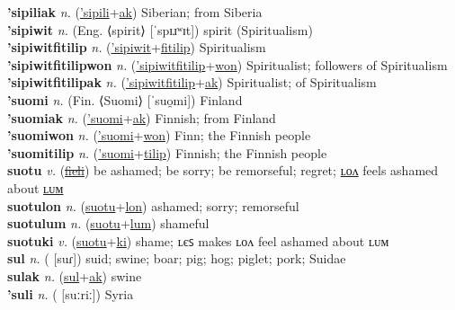 \textbf{'sipiliak} \textit{n.} (\hyperref['sipili]{'sipili}+\hyperref[ak]{ak})
Siberian; from Siberia \label{'sipiliak} \\
\textbf{'sipiwit} \textit{n.} (Eng. ⟨spirit⟩ [ˈspɪɹʷɪt])
spirit (Spiritualism) \label{'sipiwit} \\
\textbf{'sipiwitfitilip} \textit{n.} (\hyperref['sipiwit]{'sipiwit}+\hyperref[fitilip]{fitilip})
Spiritualism \label{'sipiwitfitilip} \\
\textbf{'sipiwitfitilipwon} \textit{n.} (\hyperref['sipiwitfitilip]{'sipiwitfitilip}+\hyperref[won]{won})
Spiritualist; followers of Spiritualism \label{'sipiwitfitilipwon} \\
\textbf{'sipiwitfitilipak} \textit{n.} (\hyperref['sipiwitfitilip]{'sipiwitfitilip}+\hyperref[ak]{ak})
Spiritualist; of Spiritualism \label{'sipiwitfitilipak} \\
\textbf{'suomi} \textit{n.} (Fin. ⟨Suomi⟩ [ˈsuo̯mi])
Finland \label{'suomi} \\
\textbf{'suomiak} \textit{n.} (\hyperref['suomi]{'suomi}+\hyperref[ak]{ak})
Finnish; from Finland \label{'suomiak} \\
\textbf{'suomiwon} \textit{n.} (\hyperref['suomi]{'suomi}+\hyperref[won]{won})
Finn; the Finnish people \label{'suomiwon} \\
\textbf{'suomitilip} \textit{n.} (\hyperref['suomi]{'suomi}+\hyperref[tilip]{tilip})
Finnish; the Finnish people \label{'suomitilip} \\
\textbf{suotu} \textit{v.} (\hyperref[fieli]{\sout{fieli}})
be ashamed; be sorry; be remorseful; regret; \hyperref[suotulon]{ʟᴏᴧ} feels ashamed about \hyperref[suotulum]{ʟᴜᴍ} \label{suotu} \\
\textbf{suotulon} \textit{n.} (\hyperref[suotu]{suotu}+\hyperref[lon]{lon})
ashamed; sorry; remorseful \label{suotulon} \\
\textbf{suotulum} \textit{n.} (\hyperref[suotu]{suotu}+\hyperref[lum]{lum})
shameful \label{suotulum} \\
\textbf{suotuki} \textit{v.} (\hyperref[suotu]{suotu}+\hyperref[ki]{ki})
shame; ʟєꜱ makes ʟᴏᴧ feel ashamed about ʟᴜᴍ \label{suotuki} \\
\textbf{sul} \textit{n.} ( [suɾ])
suid; swine; boar; pig; hog; piglet; pork; Suidae \label{sul} \\
\textbf{sulak} \textit{n.} (\hyperref[sul]{sul}+\hyperref[ak]{ak})
swine \label{sulak} \\
\textbf{'suli} \textit{n.} ( [suːriː])
Syria \label{'suli} \\
